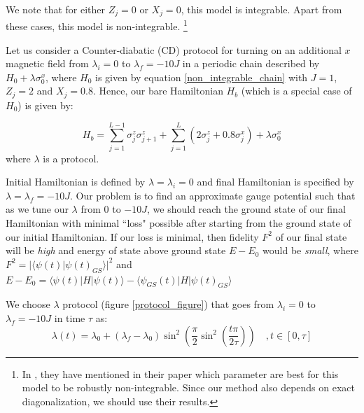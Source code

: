 \documentclass[11pt,a4paper]{article}
\begin{document}
We note that for either $Z_j=0$ or $X_j=0$, this model is integrable. Apart from these cases, this model is non-integrable. \footnote{In \cite{kim2013ballistic}, they have mentioned in their paper which parameter are best for this model to be robustly non-integrable. Since our method also depends on exact diagonalization, we should use their results.}

Let us consider a Counter-diabatic (CD) protocol for turning on an additional $x$ magnetic field from $\lambda_i=0$ to $\lambda_f=-10 J$ in a periodic chain described by $H_0 + \lambda \sigma_0^x$, where $H_0$ is given by equation \ref{non_integrable_chain} with $J=1$, $Z_j=2$ and $X_j=0.8$. Hence, our bare Hamiltonian $H_b$ (which is a special case of $H_0$) is given by:

\begin{equation}
H_b=\sum_{j=1}^{L-1}  \sigma_j^z \sigma_{j+1}^z + \sum_{j=1}^{L}   ( 2 \sigma_j^z + 0.8 \sigma_j^x) +\lambda \sigma_0^x
\label{non_integrable_chain_bare}
\end{equation}
where $\lambda$ is a protocol. 

Initial Hamiltonian is defined by $\lambda=\lambda_i=0$ and final Hamiltonian is specified by $\lambda=\lambda_f=-10J$. Our problem is to find an approximate gauge potential such that as we tune our $\lambda$ from $0$ to $-10J$, we should reach the ground state of our final Hamiltonian with minimal ``loss" possible after starting from the ground state of our initial Hamiltonian. If our loss is minimal, then fidelity $F^2$ of our final state will be \textit{high} and energy of state above ground state $E-E_0$ would be \textit{small}, where  $F^2 =  |\langle \psi (t) |\psi(t)_{GS}\rangle|^2$ and $ E-E_0=\langle \psi (t) |H|\psi(t)\rangle - \langle \psi_{GS} (t) |H|\psi(t)_{GS}\rangle$ 

 We choose $\lambda$  protocol (figure \ref{protocol_figure}) that goes from $\lambda_i=0$ to $\lambda_f=-10 J$ in time $\tau$ as:
\begin{equation}
\lambda(t) = \lambda_0 + (\lambda_f-\lambda_0)\sin^2\left(\dfrac{\pi}{2}\sin^2\left(\dfrac{t\pi}{2 \tau}\right)  \right) \quad, t \in [0, \tau]
\end{equation}
\end{document}
